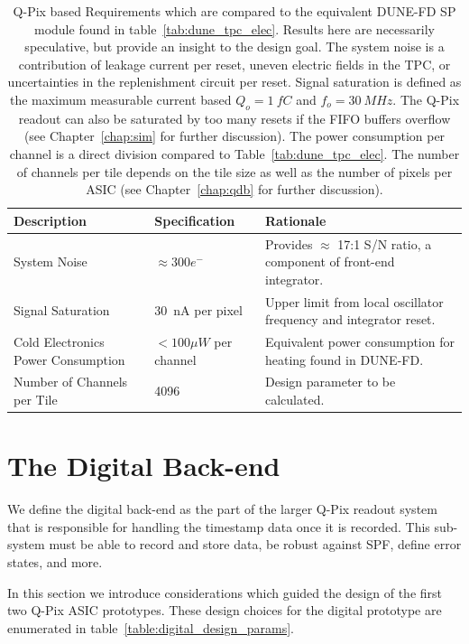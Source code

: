 \begin{table}
\begin{center}
\begin{tabular}{|| p{40mm} | p{40mm} | p{70mm} ||}
 \hline
 Description & Specification & Rationale \\ [0.5ex]
 \hline\hline
  System Noise & $\approx 300 e^{-}$ & Provides $\approx$ 17:1 S/N ratio, a component of front-end integrator. \\
 \hline
  Signal Saturation & 30~\unit{nA} per pixel & Upper limit from local oscillator frequency and integrator reset. \\
 \hline
  Cold Electronics Power Consumption & $< 100 \unit{\mu W}$ per channel & Equivalent power consumption for heating found in DUNE-FD. \\
 \hline
  Number of Channels per Tile & 4096 & Design parameter to be calculated. \\
 \hline
\end{tabular}
\caption{Q-Pix based Requirements which are compared to the equivalent DUNE-FD SP module found in table~\ref{tab:dune_tpc_elec}.
Results here are necessarily speculative, but provide an insight to the design goal.
The system noise is a contribution of leakage current per reset, uneven electric fields in the TPC, or uncertainties in the replenishment circuit per reset.
Signal saturation is defined as the maximum measurable current based $Q_{o} = 1~\unit{fC}$ and $f_{o} = 30~\unit{MHz}$.
The Q-Pix readout can also be saturated by too many resets if the FIFO buffers overflow (see Chapter~\ref{chap:sim} for further discussion).
The power consumption per channel is a direct division compared to Table~\ref{tab:dune_tpc_elec}.
The number of channels per tile depends on the tile size as well as the number of pixels per ASIC (see Chapter~\ref{chap:qdb} for further discussion).
}
\label{tab:qpix_tpc_elec}
\end{center}
\end{table}

\section{The Digital Back-end}
\label{sec:digital_back-end}
We define the digital back-end as the part of the larger Q-Pix readout system that is responsible for handling the timestamp data once it is recorded.
This sub-system must be able to record and store data, be robust against SPF, define error states, and more.

In this section we introduce considerations which guided the design of the first two Q-Pix ASIC prototypes.
These design choices for the digital prototype are enumerated in table~\ref{table:digital_design_params}.

